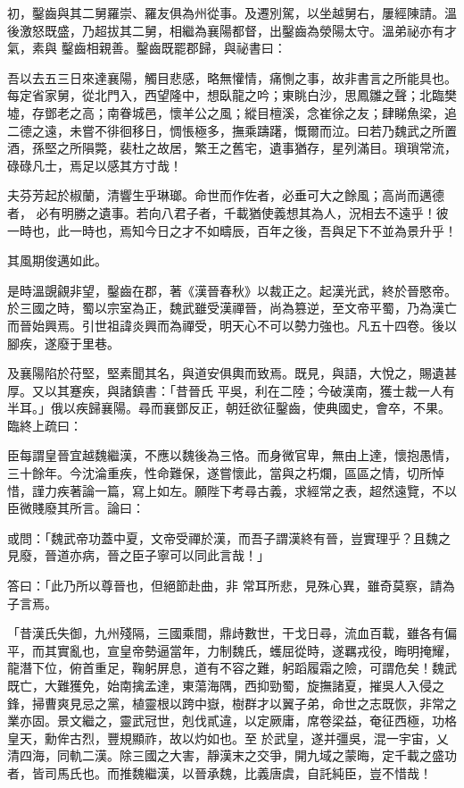 \begin{pinyinscope}
 初，鑿齒與其二舅羅崇、羅友俱為州從事。及遷別駕，以坐越舅右，屢經陳請。溫後激怒既盛，乃超拔其二舅，相繼為襄陽都督，出鑿齒為滎陽太守。溫弟祕亦有才氣，素與
 鑿齒相親善。鑿齒既罷郡歸，與祕書曰：



 吾以去五三日來達襄陽，觸目悲感，略無懽情，痛惻之事，故非書言之所能具也。每定省家舅，從北門入，西望隆中，想臥龍之吟；東眺白沙，思鳳雛之聲；北臨樊墟，存鄧老之高；南眷城邑，懷羊公之風；縱目檀溪，念崔徐之友；肆睇魚梁，追二德之遠，未嘗不徘徊移日，惆悵極多，撫乘躊躇，慨爾而泣。曰若乃魏武之所置酒，孫堅之所隕斃，裴杜之故居，繁王之舊宅，遺事猶存，星列滿目。瑣瑣常流，碌碌凡士，焉足以感其方寸哉！



 夫芬芳起於椒蘭，清響生乎琳瑯。命世而作佐者，必垂可大之餘風；高尚而邁德者，
 必有明勝之遺事。若向八君子者，千載猶使義想其為人，況相去不遠乎！彼一時也，此一時也，焉知今日之才不如疇辰，百年之後，吾與足下不並為景升乎！



 其風期俊邁如此。



 是時溫覬覦非望，鑿齒在郡，著《漢晉春秋》以裁正之。起漢光武，終於晉愍帝。於三國之時，蜀以宗室為正，魏武雖受漢禪晉，尚為篡逆，至文帝平蜀，乃為漢亡而晉始興焉。引世祖諱炎興而為禪受，明天心不可以勢力強也。凡五十四卷。後以腳疾，遂廢于里巷。



 及襄陽陷於苻堅，堅素聞其名，與道安俱輿而致焉。既見，與語，大悅之，賜遺甚厚。又以其蹇疾，與諸鎮書：「昔晉氏
 平吳，利在二陸；今破漢南，獲士裁一人有半耳。」俄以疾歸襄陽。尋而襄鄧反正，朝廷欲征鑿齒，使典國史，會卒，不果。臨終上疏曰：



 臣每謂皇晉宜越魏繼漢，不應以魏後為三恪。而身微官卑，無由上達，懷抱愚情，三十餘年。今沈淪重疾，性命難保，遂嘗懷此，當與之朽爛，區區之情，切所悼惜，謹力疾著論一篇，寫上如左。願陛下考尋古義，求經常之表，超然遠覽，不以臣微賤廢其所言。論曰：



 或問：「魏武帝功蓋中夏，文帝受禪於漢，而吾子謂漢終有晉，豈實理乎？且魏之見廢，晉道亦病，晉之臣子寧可以同此言哉！」



 答曰：「此乃所以尊晉也，但絕節赴曲，非
 常耳所悲，見殊心異，雖奇莫察，請為子言焉。



 「昔漢氏失御，九州殘隔，三國乘間，鼎歭數世，干戈日尋，流血百載，雖各有偏平，而其實亂也，宣皇帝勢逼當年，力制魏氏，蠖屈從時，遂羈戎役，晦明掩耀，龍潛下位，俯首重足，鞠躬屏息，道有不容之難，躬蹈履霜之險，可謂危矣！魏武既亡，大難獲免，始南擒孟達，東蕩海隅，西抑勁蜀，旋撫諸夏，摧吳人入侵之鋒，掃曹爽見忌之黨，植靈根以跨中嶽，樹群才以翼子弟，命世之志既恢，非常之業亦固。景文繼之，靈武冠世，剋伐貳違，以定厥庸，席卷梁益，奄征西極，功格皇天，勳侔古烈，豐規顯祚，故以灼如也。至
 於武皇，遂并彊吳，混一宇宙，乂清四海，同軌二漢。除三國之大害，靜漢末之交爭，開九域之蒙晦，定千載之盛功者，皆司馬氏也。而推魏繼漢，以晉承魏，比義唐虞，自託純臣，豈不惜哉！




\end{pinyinscope}
